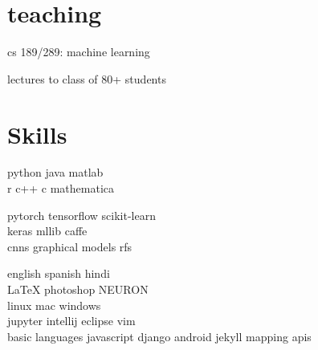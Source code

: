 
\newpage %

\begin{minipage}[t]{0.32\textwidth} %

\sectionspace

\section{teaching}

\vspace{\topsep} %

\begin{tightitemize}
\item cs 189/289: machine learning 
\item lectures to class of 80+ students \href{https://csinva.github.io/pres/189/#/}{\faChain} 
\end{tightitemize}

\sectionspace

\section{Skills}

python \textbullet{} java \textbullet{}  matlab \\ 
r \textbullet{} c++ \textbullet{} c \textbullet{} mathematica\\
\sectionspace %

pytorch \textbullet{} tensorflow \textbullet{} scikit-learn \\
keras \textbullet{} mllib \textbullet{} caffe\\ 
cnns \textbullet{} graphical models \textbullet{} rfs \\
\sectionspace %

english \textbullet{} spanish \textbullet{} hindi\\ 
\LaTeX \textbullet{} photoshop \textbullet{} NEURON\\
linux \textbullet{} mac \textbullet{} windows\\ 
jupyter \textbullet{} intellij \textbullet{} eclipse \textbullet{} vim \\
basic languages \textbullet{} javascript \textbullet{} django android \textbullet{} jekyll \textbullet{} mapping apis\\


\end{minipage}
